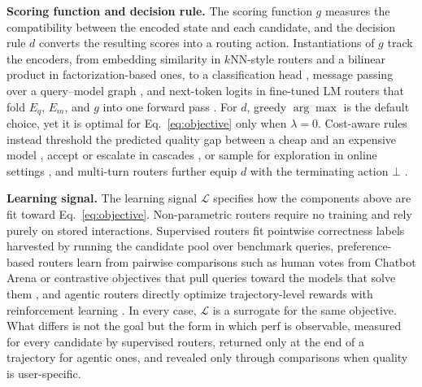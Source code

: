 \noindent\textbf{Scoring function and decision rule.}
The scoring function $g$ measures the compatibility between the encoded state and each candidate, and the decision rule $d$ converts the resulting scores into a routing action. Instantiations of $g$ track the encoders, from embedding similarity in $k$NN-style routers and a bilinear product in factorization-based ones, to a classification head \citep{ding2024hybrid, stripelis2024tensoropera}, message passing over a query--model graph \citep{feng2024graphrouter}, and next-token logits in fine-tuned LM routers that fold $E_q$, $E_m$, and $g$ into one forward pass \citep{ong2024routellm}. For $d$, greedy $\arg\max$ is the default choice, yet it is optimal for Eq.~\ref{eq:objective} only when $\lambda = 0$. Cost-aware rules instead threshold the predicted quality gap between a cheap and an expensive model \citep{ding2024hybrid}, accept or escalate in cascades \citep{chen2023frugalgpt, aggarwal2024automix}, or sample for exploration in online settings \citep{dai2024cost}, and multi-turn routers further equip $d$ with the terminating action $\bot$ \citep{zhang2025router}.

\noindent\textbf{Learning signal.}
The learning signal $\mathcal{L}$ specifies how the components above are fit toward Eq.~\ref{eq:objective}. Non-parametric routers require no training and rely purely on stored interactions. Supervised routers fit pointwise correctness labels harvested by running the candidate pool over benchmark queries, preference-based routers learn from pairwise comparisons such as human votes from Chatbot Arena \citep{ong2024routellm} or contrastive objectives that pull queries toward the models that solve them \citep{chen2024routerdc}, and agentic routers directly optimize trajectory-level rewards with reinforcement learning \citep{zhang2025router}. In every case, $\mathcal{L}$ is a surrogate for the same objective. What differs is not the goal but the form in which $\mathrm{perf}$ is observable, measured for every candidate by supervised routers, returned only at the end of a trajectory for agentic ones, and revealed only through comparisons when quality is user-specific.

